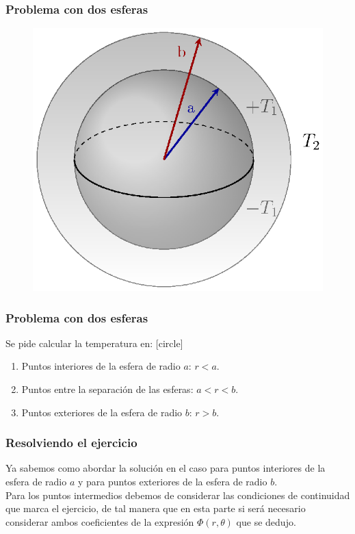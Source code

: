 \documentclass[12pt]{beamer}
\begin{document}
\begin{frame}
\frametitle{Problema con dos esferas}
\begin{figure}
    \centering
    \includegraphics[scale=0.8]{Imagenes/Ejemplo_Esfera_02.eps}
\end{figure}
\end{frame}
\begin{frame}
\frametitle{Problema con dos esferas}
Se pide calcular la temperatura en:
[circle]
\begin{enumerate}[<+->]
\item Puntos interiores de la esfera de radio $a$: $r < a$.
\item Puntos entre la separación de las esferas: $a < r < b$.
\item Puntos exteriores de la esfera de radio $b$: $r > b$.
\end{enumerate}
\end{frame}
\begin{frame}
\frametitle{Resolviendo el ejercicio}
Ya sabemos como abordar la solución en el caso para puntos interiores de la esfera de radio $a$ y para puntos exteriores de la esfera de radio $b$.
\\
\bigskip
\pause
Para los puntos intermedios debemos de considerar las condiciones de continuidad que marca el ejercicio, de tal manera que en esta parte si será necesario considerar ambos coeficientes de la expresión $\Phi(r,\theta)$ que se dedujo.
\end{frame}
\end{document}
